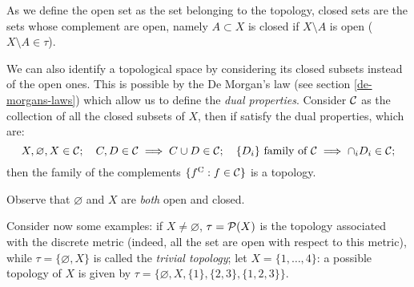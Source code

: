 As we define the open set as the set belonging to the topology, closed sets are the sets whose complement are open, namely $A \subset X$ is closed if $X \setminus A$ is open ($X \setminus A \in \tau$).

We can also identify a topological space by considering its closed subsets instead of the open ones. This is possible by the De Morgan's law (see section \vref{de-morgans-laws}) which allow us to define the \textit{dual properties}. Consider $\mathcal C$ as the collection of all the closed subsets of $X$, then if satisfy the dual properties, which are: $$X, \varnothing, X \in \mathcal C; \quad C, D \in \mathcal C \implies C \cup D \in \mathcal C; \quad \{ D_i \} \text{ family of }\mathcal C \implies \cap_i D_i \in \mathcal C;$$
then the family of the complements $\{ f^{\mathrm{C}} : f \in \mathcal C \}$ is a topology.

Observe that $\varnothing$ and $X$ are \textit{both} open and closed.

Consider now some examples: if $X \neq \varnothing$, $\tau = \mathcal P(X)$ is the topology associated with the discrete metric (indeed, all the set are open with respect to this metric), while $\tau = \{ \varnothing, X \}$ is called the \emph{trivial topology}; let $X = \{ 1, \ldots, 4 \}$: a possible topology of $X$ is given by $\tau = \{ \varnothing, X, \{ 1 \}, \{ 2, 3 \}, \{ 1, 2, 3\} \}$.

